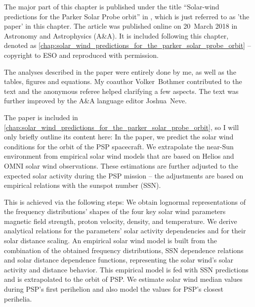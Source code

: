 The major part of this chapter is published under the title ``Solar-wind predictions for the Parker Solar Probe orbit'' in \citet{Venzmer2018}, which is just referred to as 'the paper' in this chapter. The article was published online on 20~March 2018 in Astronomy and Astrophysics (A\&A). It is included following this chapter, denoted as \autoref{chap:solar_wind_predictions_for_the_parker_solar_probe_orbit} -- copyright to ESO and reproduced with permission.

The analyses described in the paper were entirely done by me, as well as the tables, figures and equations. My coauthor Volker~Bothmer contributed to the text and the anonymous referee helped clarifying a few aspects. The text was further improved by the A\&A language editor Joshua~Neve.

The paper is included in \autoref{chap:solar_wind_predictions_for_the_parker_solar_probe_orbit}, so I will only briefly outline its content here: In the paper, we predict the solar wind conditions for the orbit of the PSP spacecraft. We extrapolate the near-Sun environment from empirical solar wind models that are based on Helios and OMNI solar wind observations. These estimations are further adjusted to the expected solar activity during the PSP mission -- the adjustments are based on empirical relations with the sunspot number (SSN).

This is achieved via the following steps: We obtain lognormal representations of the frequency distributions’ shapes of the four key solar wind parameters magnetic field strength, proton velocity, density, and temperature. We derive analytical relations for the parameters’ solar activity dependencies and for their solar distance scaling. An empirical solar wind model is built from the combination of the obtained frequency distributions, SSN dependence relations and solar distance dependence functions, representing the solar wind’s solar activity and distance behavior. This empirical model is fed with SSN predictions and is extrapolated to the orbit of PSP. We estimate solar wind median values during PSP’s first perihelion and also model the values for PSP’s closest perihelia.\\




